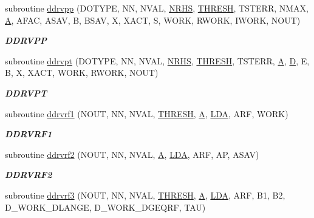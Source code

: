 \begin{DoxyCompactItemize}
subroutine \hyperlink{group__double__lin_ga17950e7ceba53c328cbc355e5f45735d}{ddrvpp} (D\+O\+T\+Y\+P\+E, N\+N, N\+V\+A\+L, \hyperlink{example__user_8c_aa0138da002ce2a90360df2f521eb3198}{N\+R\+H\+S}, \hyperlink{zlaqgs_8c_a0656018abfc9fa2821827415f5d5ea57}{T\+H\+R\+E\+S\+H}, T\+S\+T\+E\+R\+R, N\+M\+A\+X, \hyperlink{classA}{A}, A\+F\+A\+C, A\+S\+A\+V, B, B\+S\+A\+V, X, X\+A\+C\+T, S, W\+O\+R\+K, R\+W\+O\+R\+K, I\+W\+O\+R\+K, N\+O\+U\+T)
\begin{DoxyCompactList}\small\item\em {\bfseries D\+D\+R\+V\+P\+P} \end{DoxyCompactList}\item 
subroutine \hyperlink{group__double__lin_ga19b2079bcd4418269550dfc6d6e995a3}{ddrvpt} (D\+O\+T\+Y\+P\+E, N\+N, N\+V\+A\+L, \hyperlink{example__user_8c_aa0138da002ce2a90360df2f521eb3198}{N\+R\+H\+S}, \hyperlink{zlaqgs_8c_a0656018abfc9fa2821827415f5d5ea57}{T\+H\+R\+E\+S\+H}, T\+S\+T\+E\+R\+R, \hyperlink{classA}{A}, \hyperlink{odrpack_8h_a7dae6ea403d00f3687f24a874e67d139}{D}, E, B, X, X\+A\+C\+T, W\+O\+R\+K, R\+W\+O\+R\+K, N\+O\+U\+T)
\begin{DoxyCompactList}\small\item\em {\bfseries D\+D\+R\+V\+P\+T} \end{DoxyCompactList}\item 
subroutine \hyperlink{group__double__lin_ga13742181da3e865ce8ade77e43cf29ab}{ddrvrf1} (N\+O\+U\+T, N\+N, N\+V\+A\+L, \hyperlink{zlaqgs_8c_a0656018abfc9fa2821827415f5d5ea57}{T\+H\+R\+E\+S\+H}, \hyperlink{classA}{A}, \hyperlink{example__user_8c_ae946da542ce0db94dced19b2ecefd1aa}{L\+D\+A}, A\+R\+F, W\+O\+R\+K)
\begin{DoxyCompactList}\small\item\em {\bfseries D\+D\+R\+V\+R\+F1} \end{DoxyCompactList}\item 
subroutine \hyperlink{group__double__lin_gadfec0f472fd2ce54edf26dfa27fee25b}{ddrvrf2} (N\+O\+U\+T, N\+N, N\+V\+A\+L, \hyperlink{classA}{A}, \hyperlink{example__user_8c_ae946da542ce0db94dced19b2ecefd1aa}{L\+D\+A}, A\+R\+F, A\+P, A\+S\+A\+V)
\begin{DoxyCompactList}\small\item\em {\bfseries D\+D\+R\+V\+R\+F2} \end{DoxyCompactList}\item 
subroutine \hyperlink{group__double__lin_ga7ecb33ca2814a6543f4b7d1c8c1250d2}{ddrvrf3} (N\+O\+U\+T, N\+N, N\+V\+A\+L, \hyperlink{zlaqgs_8c_a0656018abfc9fa2821827415f5d5ea57}{T\+H\+R\+E\+S\+H}, \hyperlink{classA}{A}, \hyperlink{example__user_8c_ae946da542ce0db94dced19b2ecefd1aa}{L\+D\+A}, A\+R\+F, B1, B2, D\+\_\+\+W\+O\+R\+K\+\_\+\+D\+L\+A\+N\+G\+E, D\+\_\+\+W\+O\+R\+K\+\_\+\+D\+G\+E\+Q\+R\+F, T\+A\+U)

\end{DoxyCompactItemize}
